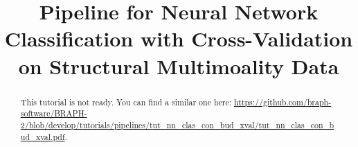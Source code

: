 \documentclass[justified]{tufte-handout}
\title[Classification Cross-Validation Structural Multimoality Data]{Pipeline for Neural Network Classification with Cross-Validation on Structural Multimoality Data}
\begin{document}
\maketitle

\begin{abstract}
\noindent
This tutorial is not ready. You can find a similar one here: \url{https://github.com/braph-software/BRAPH-2/blob/develop/tutorials/pipelines/tut_nn_clas_con_bud_xval/tut_nn_clas_con_bud_xval.pdf}.
\end{abstract}
\end{document}
